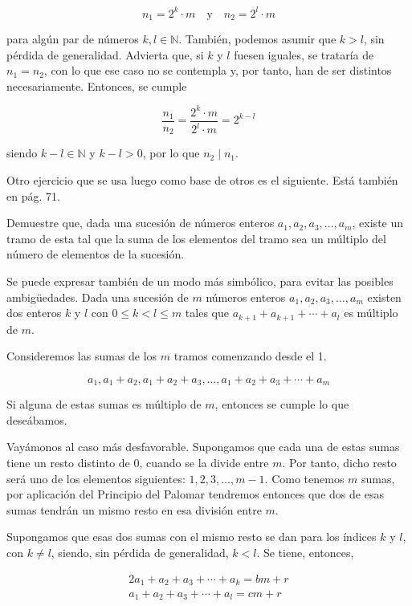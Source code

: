 $$ n_1 = 2^k \cdot m \quad \text{y} \quad n_2 = 2^l \cdot m $$

\noindent para algún par de números $k, l \in \mathbb{N}$. También, podemos
asumir que $k > l$, sin pérdida de generalidad. Advierta que, si $k$ y $l$
fuesen iguales, se trataría de $n_1 = n_2$, con lo que ese caso no se
contempla y, por tanto, han de ser distintos necesariamente. Entonces, se
cumple

$$ \frac{n_1}{n_2} = \frac{2^k \cdot m}{2^l \cdot m} = 2^{k-l} $$

\noindent siendo $k - l \in \mathbb{N}$ y $k - l > 0$, por lo que $n_2 \mid
n_1$.

Otro ejercicio que se usa luego como base de otros es el siguiente. Está
también en \cite{brualdi} pág. 71.

Demuestre que, dada una sucesión de números enteros $a_1, a_2, a_3, \ldots,
a_m$, existe un tramo de esta tal que la suma de los elementos del tramo sea
un múltiplo del número de elementos de la sucesión.

Se puede expresar también de un modo más simbólico, para evitar las posibles
ambigüedades. Dada una sucesión de $m$ números enteros $a_1, a_2, a_3,
\ldots, a_m$ existen dos enteros $k$ y $l$ con $0 \leq k < l \leq m$ tales
que $a_{k+1} + a_{k+1} + \cdots + a_l$ es múltiplo de $m$.

Consideremos las sumas de los $m$ tramos comenzando desde el 1.

$$ a_1, a_1 + a_2, a_1 + a_2 + a_3, \ldots, a_1 + a_2 + a_3 + \cdots + a_m
$$

Si alguna de estas sumas es múltiplo de $m$, entonces se cumple lo que
deseábamos.

Vayámonos al caso más desfavorable. Supongamos que cada una de estas sumas
tiene un resto distinto de 0, cuando se la divide entre $m$. Por tanto,
dicho resto será uno de los elementos siguientes: $1, 2, 3, \ldots, m-1$.
Como tenemos $m$ sumas, por aplicación del Principio del Palomar tendremos
entonces que dos de esas sumas tendrán un mismo resto en esa división entre
$m$.

Supongamos que esas dos sumas con el mismo resto se dan para los índices $k$
y $l$, con $k \neq l$, siendo, sin pérdida de generalidad, $k < l$. Se
tiene, entonces,

\begin{alignat*}{2}
  a_1 + a_2 + a_3 + \cdots + a_k = bm + r \\
  a_1 + a_2 + a_3 + \cdots + a_l = cm + r \\
\end{alignat*}

